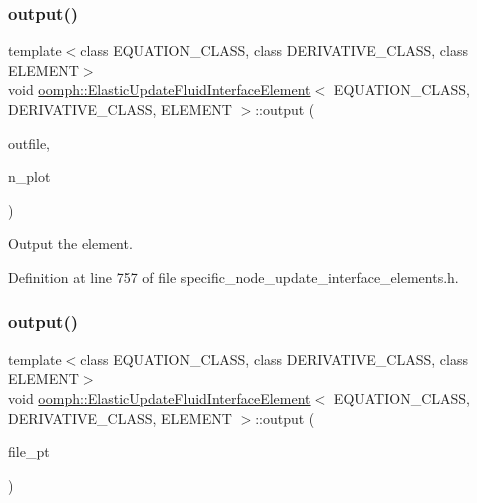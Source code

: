\subsubsection{\texorpdfstring{output()}{output()}\hspace{0.1cm}{\footnotesize\ttfamily [2/4]}}
{\footnotesize\ttfamily template$<$class E\+Q\+U\+A\+T\+I\+O\+N\+\_\+\+C\+L\+A\+SS, class D\+E\+R\+I\+V\+A\+T\+I\+V\+E\+\_\+\+C\+L\+A\+SS, class E\+L\+E\+M\+E\+NT$>$ \\
void \hyperlink{classoomph_1_1ElasticUpdateFluidInterfaceElement}{oomph\+::\+Elastic\+Update\+Fluid\+Interface\+Element}$<$ E\+Q\+U\+A\+T\+I\+O\+N\+\_\+\+C\+L\+A\+SS, D\+E\+R\+I\+V\+A\+T\+I\+V\+E\+\_\+\+C\+L\+A\+SS, E\+L\+E\+M\+E\+NT $>$\+::output (\begin{DoxyParamCaption}\item[{std\+::ostream \&}]{outfile,  }\item[{const unsigned \&}]{n\+\_\+plot }\end{DoxyParamCaption})\hspace{0.3cm}{\ttfamily [inline]}}



Output the element. 



Definition at line 757 of file specific\+\_\+node\+\_\+update\+\_\+interface\+\_\+elements.\+h.

\mbox{\label{classoomph_1_1ElasticUpdateFluidInterfaceElement_a8baae14bdede6a659e948942d7a08cb5}} 
\subsubsection{\texorpdfstring{output()}{output()}\hspace{0.1cm}{\footnotesize\ttfamily [3/4]}}
{\footnotesize\ttfamily template$<$class E\+Q\+U\+A\+T\+I\+O\+N\+\_\+\+C\+L\+A\+SS, class D\+E\+R\+I\+V\+A\+T\+I\+V\+E\+\_\+\+C\+L\+A\+SS, class E\+L\+E\+M\+E\+NT$>$ \\
void \hyperlink{classoomph_1_1ElasticUpdateFluidInterfaceElement}{oomph\+::\+Elastic\+Update\+Fluid\+Interface\+Element}$<$ E\+Q\+U\+A\+T\+I\+O\+N\+\_\+\+C\+L\+A\+SS, D\+E\+R\+I\+V\+A\+T\+I\+V\+E\+\_\+\+C\+L\+A\+SS, E\+L\+E\+M\+E\+NT $>$\+::output (\begin{DoxyParamCaption}\item[{F\+I\+LE $\ast$}]{file\+\_\+pt }\end{DoxyParamCaption})\hspace{0.3cm}{\ttfamily [inline]}}



